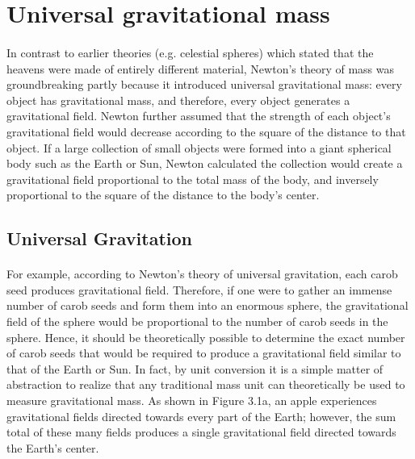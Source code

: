 \documentclass{book}
\begin{document}
	\section{Universal gravitational mass}
	\paragraph{}
	
	\begin{multicols}{2}
		\setlength{\columnseprule}{1pt}
		In contrast to earlier theories (e.g. celestial spheres) which stated that the heavens were made of entirely different material, Newton's theory of mass was groundbreaking partly because it introduced universal gravitational mass: every object has gravitational mass, and therefore, every object generates a gravitational field. Newton further assumed that the strength of each object's gravitational field would decrease according to the square of the distance to that object. If a large collection of small objects were formed into a giant spherical body such as the Earth or Sun, Newton calculated the collection would create a gravitational field proportional to the total mass of the body, and inversely proportional to the square of the distance to the body's center.
	\end{multicols}

\subsection{Universal Gravitation}
\paragraph{}
For example, according to Newton's theory of universal gravitation, each carob seed produces gravitational field. Therefore, if one were to gather an immense number of carob seeds and form them into an enormous sphere, the gravitational field of the sphere would be proportional to the number of carob seeds in the sphere. Hence, it should be theoretically possible to determine the exact number of carob seeds that would be required to produce a gravitational field similar to that of the Earth or Sun. In fact, by unit conversion it is a simple matter of abstraction to realize that any traditional mass unit can theoretically be used to measure gravitational mass. As shown in Figure 3.1a, an apple experiences gravitational fields directed towards every part of the Earth; however, the sum total of these many fields produces a single gravitational field directed towards the Earth's center.
\end{document}
